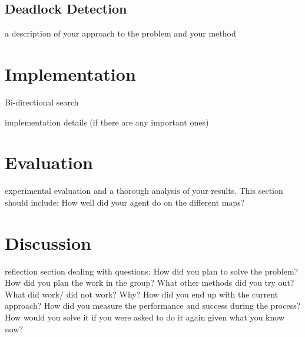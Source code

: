 \documentclass[a4paper,11pt]{article}
\begin{document}
\subsection{Deadlock Detection}
a description of your approach to the problem and your method
\section{Implementation}
\begin{algorithm}
  \DontPrintSemicolon

\caption{Bi-directional search}
\end{algorithm}

implementation details (if there are any important ones)
\section{Evaluation}
experimental evaluation and a thorough analysis of your results. This section should include:
How well did your agent do on the different maps?
\section{Discussion}
reflection section dealing with questions: How did you plan to solve the problem? How did you plan the work in the group? What other methods did you try out? What did work/ did not work? Why? How did you end up with the current approach? How did you measure the performance and success during the process? How would you solve it if you were asked to do it again given what you know now?

\printbibliography
\end{document}
